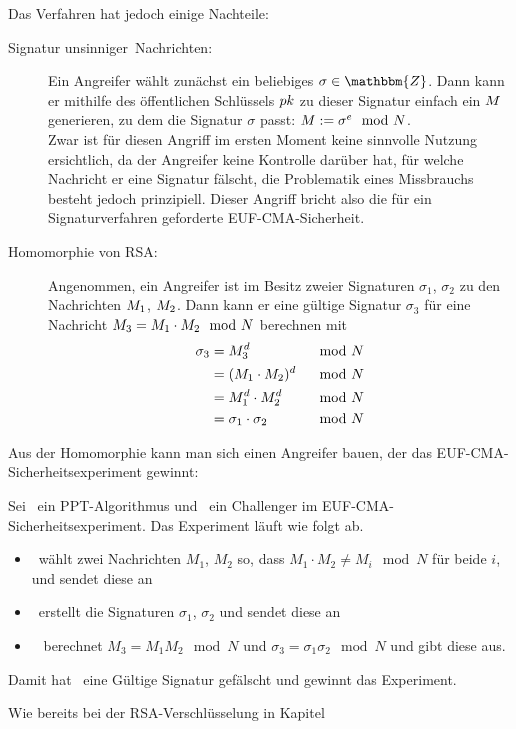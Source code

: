 Das Verfahren hat jedoch einige Nachteile:
\begin{description}
\item[Signatur \glqq unsinniger\grqq~Nachrichten:] Ein Angreifer
  wählt zunächst ein beliebiges $\sigma \in \mathbbm{Z}$. Dann kann er
  mithilfe des öffentlichen Schlüssels $pk$ zu dieser Signatur einfach
  ein $M$ generieren, zu dem die Signatur $\sigma$ passt: $M
  := \sigma^e \mod N$.\\ Zwar ist für diesen Angriff im ersten Moment
  keine sinnvolle Nutzung ersichtlich, da der Angreifer keine Kontrolle
  darüber hat, für welche Nachricht er eine Signatur fälscht, die
  Problematik eines Missbrauchs besteht jedoch prinzipiell. Dieser Angriff
  bricht also die für ein Signaturverfahren geforderte EUF-CMA-Sicherheit.
\item[Homomorphie von RSA:]\indexRSAHomomorphie Angenommen, ein
  Angreifer ist im Besitz zweier Signaturen $\sigma_1$, $\sigma_2$ zu den
  Nachrichten $M_1$, $M_2$. Dann kann er eine gültige Signatur
  $\sigma_3$ für eine Nachricht $M_3 = M_1 \cdot M_2
  \mod N$ berechnen mit
  \begin{alignat*}{2} 
    \sigma_3 &= M_3^d & \mod N\\
    &= (M_1 \cdot M_2)^d & \mod N \\
    &= M_1^d \cdot M_2^d &\mod N\\
    &= \sigma_1 \cdot \sigma_2 &\mod N
  \end{alignat*}
\end{description}
Aus der Homomorphie kann man sich einen Angreifer
bauen, der das EUF-CMA-Sicherheits\-experiment gewinnt:
\begin{beispiel} Sei \A~ein PPT-Algorithmus und \C~ein Challenger im
  EUF-CMA-Sicherheits\-experiment. Das Experiment läuft wie folgt ab.
  \begin{itemize}
  \item \A~wählt zwei Nachrichten $M_1$, $M_2$ so, dass $ M_1\cdot M_2
    \neq M_i \mod N$ für beide $i$, und sendet diese an \C
  \item \C~erstellt die Signaturen $\sigma_1$, $\sigma_2$ und sendet
    diese an \A
  \item \A~ berechnet $M_3=M_1M_2 \mod N$ und
    $\sigma_3=\sigma_1\sigma_2 \mod N$ und gibt diese aus.
  \end{itemize} Damit hat \A~eine Gültige Signatur gefälscht und
  gewinnt das Experiment.
\end{beispiel} Wie bereits bei der RSA-Verschlüsselung in Kapitel
